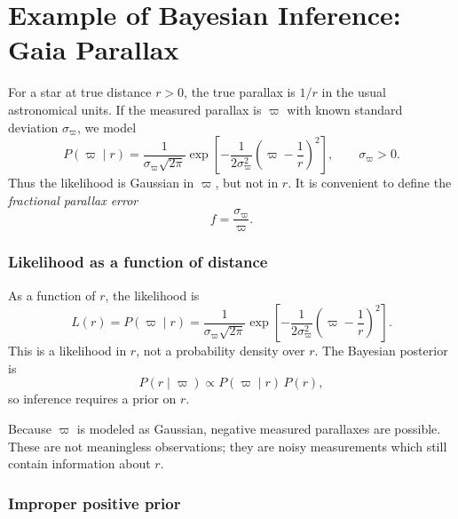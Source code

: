 \documentclass[11pt, titlepage]{article} %
\numberwithin{equation}{section}
\theoremstyle{definition}
\numberwithin{assumption}{section}
\begin{document}
\section{Example of Bayesian Inference: Gaia Parallax}

For a star at true distance $r>0$, the true parallax is $1/r$ in the usual astronomical units. If the measured parallax is $\varpi$ with known standard deviation $\sigma_\varpi$, we model
\begin{equation*}
    P(\varpi\mid r)
    =
    \frac{1}{\sigma_\varpi\sqrt{2\pi}}
    \exp\!\left[
    -\frac{1}{2\sigma_\varpi^2}
    \left(\varpi-\frac{1}{r}\right)^2
    \right],
    \qquad \sigma_\varpi>0.
\end{equation*}
Thus the likelihood is Gaussian in $\varpi$, but not in $r$. It is convenient to define the \textit{fractional parallax error}
\begin{equation*}
    f=\frac{\sigma_\varpi}{\varpi}.
\end{equation*}

\subsubsection*{Likelihood as a function of distance}

As a function of $r$, the likelihood is
\begin{equation*}
    L(r)=P(\varpi\mid r)
    =
    \frac{1}{\sigma_\varpi\sqrt{2\pi}}
    \exp\!\left[
    -\frac{1}{2\sigma_\varpi^2}
    \left(\varpi-\frac{1}{r}\right)^2
    \right].
\end{equation*}
This is a likelihood in $r$, not a probability density over $r$. The Bayesian posterior is
\begin{equation*}
    P(r\mid \varpi)\propto P(\varpi\mid r)\,P(r),
\end{equation*}
so inference requires a prior on $r$.

Because $\varpi$ is modeled as Gaussian, negative measured parallaxes are possible. These are not meaningless observations; they are noisy measurements which still contain information about $r$.

\subsubsection*{Improper positive prior}
\end{document}
